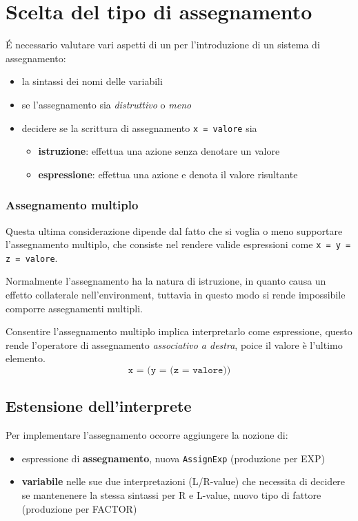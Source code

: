 \section{Scelta del tipo di assegnamento}
É necessario valutare vari aspetti di un per l'introduzione di un sistema di assegnamento:
\begin{itemize}
    \item la sintassi dei nomi delle variabili
    \item se l'assegnamento sia \textit{distruttivo} o \textit{meno}
    \item decidere se la scrittura di assegnamento \texttt{x = valore} sia
    \begin{itemize}
        \item \textbf{istruzione}: effettua una azione senza denotare un valore
        \item \textbf{espressione}: effettua una azione e denota il valore risultante
    \end{itemize}
\end{itemize}

\subsubsection{Assegnamento multiplo}
Questa ultima considerazione dipende dal fatto che si voglia o meno supportare l'assegnamento multiplo, che consiste nel rendere valide espressioni come \texttt{x = y = z = valore}.

Normalmente l'assegnamento ha la natura di istruzione, in quanto causa un effetto collaterale nell'environment, tuttavia in questo modo si rende impossibile comporre assegnamenti multipli.

Consentire l'assegnamento multiplo implica interpretarlo come espressione, questo rende l'operatore di assegnamento \textit{associativo a destra}, poice il valore è l'ultimo elemento.
\begin{equation*}
    \texttt{x = (y = (z = valore))}
\end{equation*}

\subsection{Estensione dell'interprete}
Per implementare l'assegnamento occorre aggiungere la nozione di:
\begin{itemize}
    \item espressione di \textbf{assegnamento}, nuova \texttt{AssignExp} (produzione per EXP)
    \item \textbf{variabile} nelle sue due interpretazioni (L/R-value) che necessita di decidere se mantenenere la stessa sintassi per R e L-value, nuovo tipo di fattore (produzione per FACTOR)
\end{itemize}


